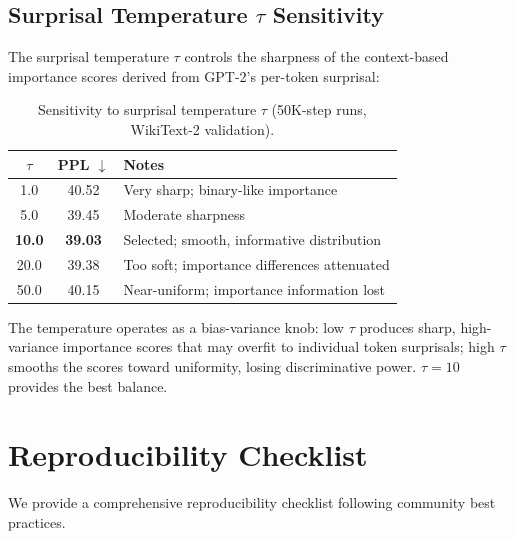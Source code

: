 \subsection{Surprisal Temperature $\tau$ Sensitivity}

The surprisal temperature $\tau$ controls the sharpness of the context-based importance scores derived from GPT-2's per-token surprisal:

\begin{table}[h]
\centering
\caption{Sensitivity to surprisal temperature $\tau$ (50K-step runs, WikiText-2 validation).}
\label{tab:tau-sensitivity}
\begin{tabular}{ccl}
\toprule
$\tau$ & \textbf{PPL} $\downarrow$ & \textbf{Notes} \\
\midrule
1.0 & 40.52 & Very sharp; binary-like importance \\
5.0 & 39.45 & Moderate sharpness \\
\textbf{10.0} & \textbf{39.03} & Selected; smooth, informative distribution \\
20.0 & 39.38 & Too soft; importance differences attenuated \\
50.0 & 40.15 & Near-uniform; importance information lost \\
\bottomrule
\end{tabular}
\end{table}

The temperature operates as a bias-variance knob: low $\tau$ produces sharp, high-variance importance scores that may overfit to individual token surprisals; high $\tau$ smooths the scores toward uniformity, losing discriminative power. $\tau = 10$ provides the best balance.

\section{Reproducibility Checklist}
\label{app:reproducibility}

We provide a comprehensive reproducibility checklist following community best practices.

